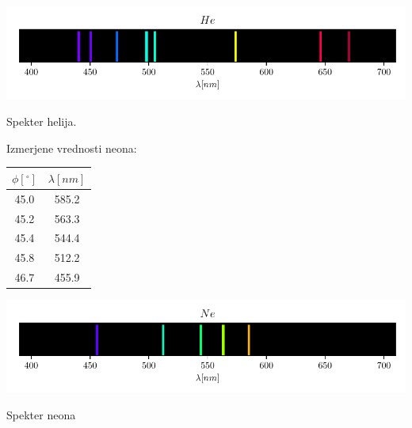 \documentclass[12pt]{report}
\begin{document}
\begin{slika}[H]
  \centering
  \includegraphics{He}
  \caption{\small Spekter helija.}
\end{slika}

Izmerjene vrednosti neona: 

\begin{tabela}[H]
  \centering
  \begin{tabular}{|c|c|}\hline
    $\phi [^{\circ}]$ & $\lambda [nm]$ \\ \hline
    45.0 &   585.2\\
    45.2 &   563.3\\
    45.4 &   544.4\\
    45.8 &   512.2\\
    46.7 &   455.9\\ \hline
  \end{tabular}
\end{tabela}

\begin{slika}[H]
  \centering
  \includegraphics{Ne}
  \caption{\small Spekter neona}
\end{slika}
\end{document}
